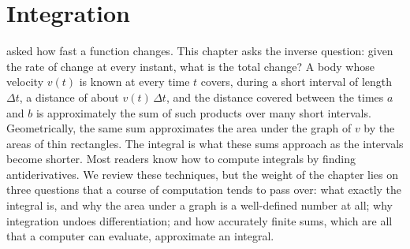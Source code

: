 \chapter{Integration}
\label{ch:integration}


 asked how fast a function changes. This chapter asks the inverse question: given the rate of change at every instant, what is the total change? A body whose velocity $v(t)$ is known at every time $t$ covers, during a short interval of length $\Delta t$, a distance of about $v(t)\,\Delta t$, and the distance covered between the times $a$ and $b$ is approximately the sum of such products over many short intervals. Geometrically, the same sum approximates the area under the graph of $v$ by the areas of thin rectangles. The integral is what these sums approach as the intervals become shorter. Most readers know how to compute integrals by finding antiderivatives. We review these techniques, but the weight of the chapter lies on three questions that a course of computation tends to pass over: what exactly the integral is, and why the area under a graph is a well-defined number at all; why integration undoes differentiation; and how accurately finite sums, which are all that a computer can evaluate, approximate an integral.

